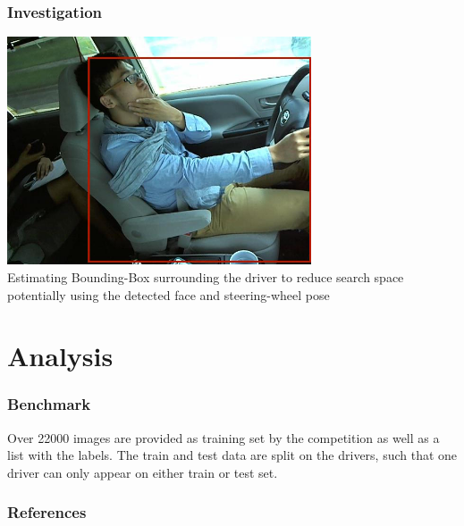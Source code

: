 \documentclass{beamer}
\begin{document}
    \begin{frame}
		\frametitle{Investigation}
        \begin{center}
        \includegraphics[width=9cm]{images/BoundingBox.jpg}\\
        Estimating Bounding-Box surrounding the driver to reduce search space potentially using the detected face and steering-wheel pose\end{center}
    \end{frame}

	
	\section{Analysis}	
	\begin{frame}
		\frametitle{Benchmark}
		Over 22000 images are provided as training set by the competition as well as a list with the labels. The train and test data are split on the drivers, such that one driver can only appear on either train or test set. 		


	\end{frame}

		
		


		
		\begin{frame}[allowframebreaks]
			\frametitle{References} 
			\nocite{*} 
			 
			 
		\end{frame}
		
		\medskip	
		

	
		
\end{document}

